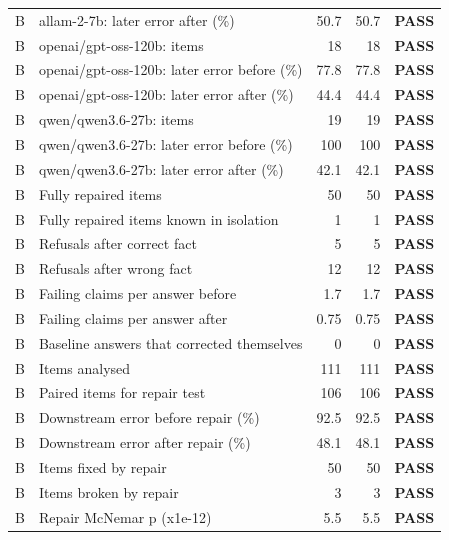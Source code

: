 {\begin{longtable}{@{}cp{8.2cm}rrc@{}}
B & allam-2-7b: later error after (\%) & 50.7 & 50.7 & \textcolor{okgreen}{\textbf{PASS}} \\
B & openai/gpt-oss-120b: items & 18 & 18 & \textcolor{okgreen}{\textbf{PASS}} \\
B & openai/gpt-oss-120b: later error before (\%) & 77.8 & 77.8 & \textcolor{okgreen}{\textbf{PASS}} \\
B & openai/gpt-oss-120b: later error after (\%) & 44.4 & 44.4 & \textcolor{okgreen}{\textbf{PASS}} \\
B & qwen/qwen3.6-27b: items & 19 & 19 & \textcolor{okgreen}{\textbf{PASS}} \\
B & qwen/qwen3.6-27b: later error before (\%) & 100 & 100 & \textcolor{okgreen}{\textbf{PASS}} \\
B & qwen/qwen3.6-27b: later error after (\%) & 42.1 & 42.1 & \textcolor{okgreen}{\textbf{PASS}} \\
B & Fully repaired items & 50 & 50 & \textcolor{okgreen}{\textbf{PASS}} \\
B & Fully repaired items known in isolation & 1 & 1 & \textcolor{okgreen}{\textbf{PASS}} \\
B & Refusals after correct fact & 5 & 5 & \textcolor{okgreen}{\textbf{PASS}} \\
B & Refusals after wrong fact & 12 & 12 & \textcolor{okgreen}{\textbf{PASS}} \\
B & Failing claims per answer before & 1.7 & 1.7 & \textcolor{okgreen}{\textbf{PASS}} \\
B & Failing claims per answer after & 0.75 & 0.75 & \textcolor{okgreen}{\textbf{PASS}} \\
B & Baseline answers that corrected themselves & 0 & 0 & \textcolor{okgreen}{\textbf{PASS}} \\
B & Items analysed & 111 & 111 & \textcolor{okgreen}{\textbf{PASS}} \\
B & Paired items for repair test & 106 & 106 & \textcolor{okgreen}{\textbf{PASS}} \\
B & Downstream error before repair (\%) & 92.5 & 92.5 & \textcolor{okgreen}{\textbf{PASS}} \\
B & Downstream error after repair (\%) & 48.1 & 48.1 & \textcolor{okgreen}{\textbf{PASS}} \\
B & Items fixed by repair & 50 & 50 & \textcolor{okgreen}{\textbf{PASS}} \\
B & Items broken by repair & 3 & 3 & \textcolor{okgreen}{\textbf{PASS}} \\
B & Repair McNemar p (x1e-12) & 5.5 & 5.5 & \textcolor{okgreen}{\textbf{PASS}} \\

\end{longtable}}
